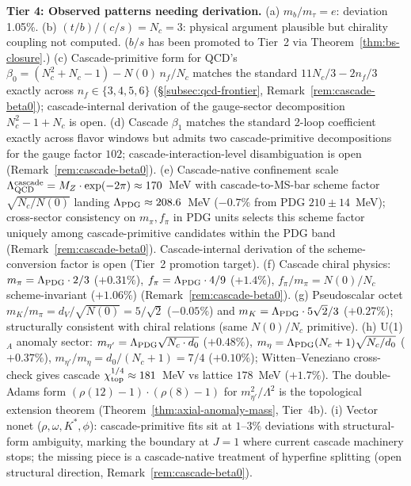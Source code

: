 \documentclass[12pt,a4paper]{article}
\begin{document}
\textbf{Tier 4: Observed patterns needing derivation.} (a) $m_b/m_\tau = e$: deviation 1.05\%. (b) $(t/b)/(c/s) = N_c = 3$: physical argument plausible but chirality coupling not computed. ($b/s$ has been promoted to Tier~2 via Theorem~\ref{thm:bs-closure}.) (c) Cascade-primitive form for QCD's $\beta_0 = (N_c^2 + N_c - 1) - N(0)\,n_f/N_c$ matches the standard $11 N_c/3 - 2 n_f/3$ exactly across $n_f\in\{3,4,5,6\}$ (\S\ref{subsec:qcd-frontier}, Remark~\ref{rem:cascade-beta0}); cascade-internal derivation of the gauge-sector decomposition $N_c^2 - 1 + N_c$ is open. (d) Cascade $\beta_1$ matches the standard 2-loop coefficient exactly across flavor windows but admits two cascade-primitive decompositions for the gauge factor $102$; cascade-interaction-level disambiguation is open (Remark~\ref{rem:cascade-beta0}). (e) Cascade-native confinement scale $\Lambda_{\rm QCD}^{\rm cascade} = M_Z\cdot\exp(-2\pi)\approx 170$~MeV with cascade-to-MS-bar scheme factor $\sqrt{N_c/N(0)}$ landing $\Lambda_{\rm PDG} \approx 208.6$~MeV ($-0.7\%$ from PDG $210\pm 14$~MeV); cross-sector consistency on $m_\pi, f_\pi$ in PDG units selects this scheme factor uniquely among cascade-primitive candidates within the PDG band (Remark~\ref{rem:cascade-beta0}). Cascade-internal derivation of the scheme-conversion factor is open (Tier~2 promotion target). (f) Cascade chiral physics: $m_\pi = \Lambda_{\rm PDG}\cdot 2/3$ ($+0.31\%$), $f_\pi = \Lambda_{\rm PDG}\cdot 4/9$ ($+1.4\%$), $f_\pi/m_\pi = N(0)/N_c$ scheme-invariant ($+1.06\%$) (Remark~\ref{rem:cascade-beta0}). (g) Pseudoscalar octet $m_K/m_\pi = d_V/\sqrt{N(0)} = 5/\sqrt{2}$ ($-0.05\%$) and $m_K = \Lambda_{\rm PDG}\cdot 5\sqrt{2}/3$ ($+0.27\%$); structurally consistent with chiral relations (same $N(0)/N_c$ primitive). (h) U(1)$_A$ anomaly sector: $m_{\eta'} = \Lambda_{\rm PDG}\sqrt{N_c\cdot d_0}$ ($+0.48\%$), $m_\eta = \Lambda_{\rm PDG}(N_c+1)\sqrt{N_c/d_0}$ ($+0.37\%$), $m_{\eta'}/m_\eta = d_0/(N_c+1) = 7/4$ ($+0.10\%$); Witten--Veneziano cross-check gives cascade $\chi_{\rm top}^{1/4} \approx 181$~MeV vs lattice $178$~MeV ($+1.7\%$). The double-Adams form $(\rho(12)-1)\cdot(\rho(8)-1)$ for $m_{\eta'}^2/\Lambda^2$ is the topological extension theorem (Theorem~\ref{thm:axial-anomaly-mass}, Tier~4b). (i) Vector nonet ($\rho, \omega, K^*, \phi$): cascade-primitive fits sit at $1$--$3\%$ deviations with structural-form ambiguity, marking the boundary at $J=1$ where current cascade machinery stops; the missing piece is a cascade-native treatment of hyperfine splitting (open structural direction, Remark~\ref{rem:cascade-beta0}).
\end{document}
